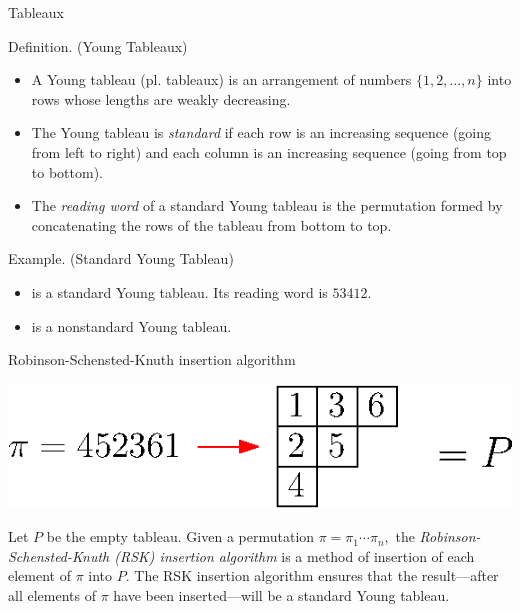 \documentclass[aspectratio=169, serif]{beamer}
\begin{document}
\begin{frame}{Tableaux}
    \begin{block}{Definition. (Young Tableaux)}
        \begin{itemize}
        \small
            \item A Young tableau (pl. tableaux) is an arrangement of numbers $\{1,2,...,n\}$ into rows whose lengths are weakly decreasing.\vspace{-0.25em}
            \item The Young tableau is \textit{standard} if each row is an increasing sequence (going from left to right) and each column is an increasing sequence (going from top to bottom). \vspace{-0.25em}
            \item The \textit{reading word} of a standard Young tableau is the permutation formed by concatenating the rows of the tableau from bottom to top.
        \end{itemize}
    \end{block}
    \begin{exampleblock}{Example. (Standard Young Tableau)}
        \begin{itemize}
        \item {} is a standard Young tableau. Its reading word is $53412.$ %
        \item {} is a nonstandard Young tableau.
        \end{itemize}
        \vspace{-3.8pt}
    \end{exampleblock}
\end{frame}
\begin{frame}{Robinson-Schensted-Knuth insertion algorithm}
        \begin{center}
            \includegraphics[scale = 0.85]{RS_Example.eps}
        \end{center}
    Let $P$ be the empty tableau. Given a permutation $\pi = \pi_1\cdots\pi_n,$ the \textit{Robinson-Schensted-Knuth (RSK) insertion algorithm} is a method of insertion of each element of $\pi$ into $P.$ The RSK insertion algorithm ensures that the result---after all elements of $\pi$ have been inserted---will be a standard Young tableau.
\end{frame}
\end{document}
